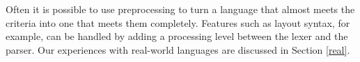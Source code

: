 \documentclass{llncs}
\begin{document}
Often it is possible to use preprocessing to turn a language that almost
meets the criteria into one that meets them completely. Features such as
layout syntax, for example, can be handled by adding a processing level
between the lexer and the parser. Our experiences with real-world
languages are discussed in Section \ref{real}.






\end{document}
